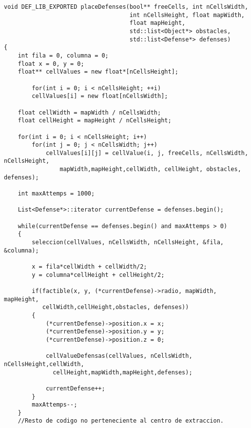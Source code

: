 \begin{lstlisting}
void DEF_LIB_EXPORTED placeDefenses(bool** freeCells, int nCellsWidth,
                                    int nCellsHeight, float mapWidth,
                                    float mapHeight,
                                    std::list<Object*> obstacles,
                                    std::list<Defense*> defenses)
{
    int fila = 0, columna = 0;
    float x = 0, y = 0;
    float** cellValues = new float*[nCellsHeight];
    
		for(int i = 0; i < nCellsHeight; ++i)
	    cellValues[i] = new float[nCellsWidth];

    float cellWidth = mapWidth / nCellsWidth;
    float cellHeight = mapHeight / nCellsHeight;

    for(int i = 0; i < nCellsHeight; i++)
  		for(int j = 0; j < nCellsWidth; j++)
  			cellValues[i][j] = cellValue(i, j, freeCells, nCellsWidth, nCellsHeight,
  				mapWidth,mapHeight,cellWidth, cellHeight, obstacles, defenses);

    int maxAttemps = 1000;

    List<Defense*>::iterator currentDefense = defenses.begin();

    while(currentDefense == defenses.begin() and maxAttemps > 0)
    {
        seleccion(cellValues, nCellsWidth, nCellsHeight, &fila, &columna);

        x = fila*cellWidth + cellWidth/2;
        y = columna*cellHeight + cellHeight/2;

        if(factible(x, y, (*currentDefense)->radio, mapWidth, mapHeight,
           cellWidth,cellHeight,obstacles, defenses))
        {
            (*currentDefense)->position.x = x;
            (*currentDefense)->position.y = y;
            (*currentDefense)->position.z = 0;

            cellValueDefensas(cellValues, nCellsWidth, nCellsHeight,cellWidth,
              cellHeight,mapWidth,mapHeight,defenses);

            currentDefense++;
        }
        maxAttemps--;
    }
    //Resto de codigo no perteneciente al centro de extraccion.
\end{lstlisting}
